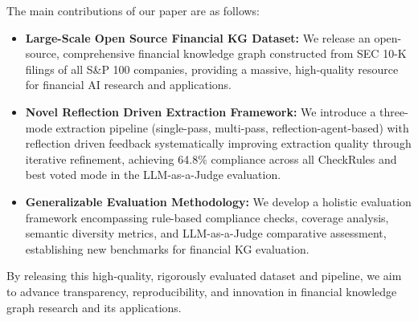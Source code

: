 The main contributions of our paper are as follows:
\begin{itemize}
\item \textbf{Large-Scale Open Source Financial KG Dataset:} We release an open-source, comprehensive financial knowledge graph constructed from SEC 10-K filings of all S\&P 100 companies, providing a massive, high-quality resource for financial AI research and applications.

\item \textbf{Novel Reflection Driven Extraction Framework:} We introduce a three-mode extraction pipeline (single-pass, multi-pass, reflection-agent-based) with reflection driven feedback systematically improving extraction quality through iterative refinement, achieving 64.8\% compliance across all CheckRules and best voted mode in the LLM-as-a-Judge evaluation.

\item \textbf{Generalizable Evaluation Methodology:} We develop a holistic evaluation framework encompassing rule-based compliance checks, coverage analysis, semantic diversity metrics, and LLM-as-a-Judge comparative assessment, establishing new benchmarks for financial KG evaluation.
\end{itemize}

By releasing this high-quality, rigorously evaluated dataset and pipeline, we aim to advance transparency, reproducibility, and innovation in financial knowledge graph research and its applications.


